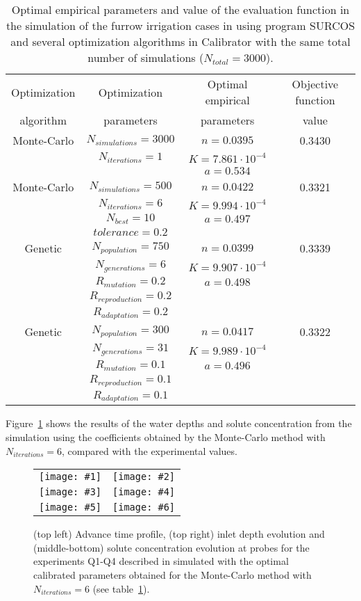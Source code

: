 \documentclass[review,authoryear]{elsarticle}
\newcommand{\TABLE}[5]
{
	\begin{table}[ht!]
		\centering
		\caption{#4.\label{#5}}
		#1
		\begin{tabular}{#2}
			#3
		\end{tabular}
	\end{table}
}
\newcommand{\FIGVI}[8]
{
	\begin{figure}[ht!]
		\centering
		\begin{tabular}{cc}
			\texttt{[image: \#1]} & \texttt{[image: \#2]} \\
			\texttt{[image: \#3]} & \texttt{[image: \#4]} \\
			\texttt{[image: \#5]} & \texttt{[image: \#6]}
		\end{tabular}
		\caption{#7.\label{#8}}
	\end{figure}
}
\begin{document}
\TABLE{\scriptsize}{cccc}
{
	Optimization & Optimization & Optimal empirical & Objective function
	\\ algorithm & parameters & parameters & value
	\\ \hline
	Monte-Carlo & $N_{simulations}=3000$ & $n=0.0395$ & 0.3430
	\\ & $N_{iterations}=1$ & $K=7.861\cdot 10^{-4}$
	\\ & & $a=0.534$
	\\ \hline
	Monte-Carlo & $N_{simulations}=500$ & $n=0.0422$ & 0.3321
	\\ & $N_{iterations}=6$ & $K=9.994\cdot 10^{-4}$
	\\ & $N_{best}=10$ & $a=0.497$
	\\ & $tolerance=0.2$
	\\ \hline
	Genetic & $N_{population}=750$ & $n=0.0399$ & 0.3339
	\\ & $N_{generations}=6$ & $K=9.907\cdot 10^{-4}$
	\\ & $R_{mutation}=0.2$ & $a=0.498$
	\\ & $R_{reproduction}=0.2$
	\\ & $R_{adaptation}=0.2$
	\\ \hline
	Genetic & $N_{population}=300$ & $n=0.0417$ & 0.3322
	\\ & $N_{generations}=31$ & $K=9.989\cdot 10^{-4}$
	\\ & $R_{mutation}=0.1$ & $a=0.496$
	\\ & $R_{reproduction}=0.1$
	\\ & $R_{adaptation}=0.1$
	\\ \hline
}{Optimal empirical parameters and value of the evaluation function in the simulation of the furrow irrigation cases in \citet{JaviSurcos2} using program SURCOS and several optimization algorithms in Calibrator with the same total number of simulations ($N_{total}=3000$)}{TabSurcos}

Figure~\ref{FigSurcos} shows the results of the water depths and solute concentration from the simulation using the coefficients obtained by the Monte-Carlo method with $N_{iterations}=6$, compared with the experimental values.

\FIGVI{surcos-advance.eps}{surcos-depth.eps}{surcos-solute-q1.eps}
{surcos-solute-q2.eps}{surcos-solute-q3.eps}{surcos-solute-q4.eps}
{(top left) Advance time profile, (top right) inlet depth evolution and
(middle-bottom) solute concentration evolution at probes for the experiments
Q1-Q4 described in \citet{JaviSurcos2} simulated with the optimal calibrated
parameters obtained for the Monte-Carlo method with $N_{iterations}=6$ (see
table~\ref{TabSurcos})}{FigSurcos}
\end{document}
